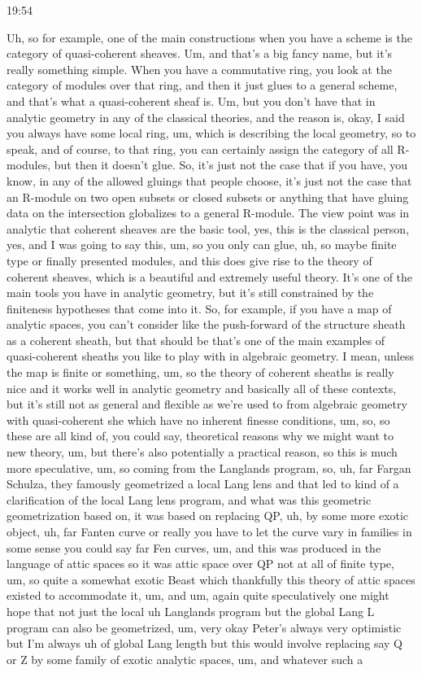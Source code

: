 \begin{unfinished}{19:54}

Uh, so for example, one of the main constructions when you have a scheme is the category of quasi-coherent sheaves. Um, and that's a big fancy name, but it's really something simple. When you have a commutative ring, you look at the category of modules over that ring, and then it just glues to a general scheme, and that's what a quasi-coherent sheaf is. Um, but you don't have that in analytic geometry in any of the classical theories, and the reason is, okay, I said you always have some local ring, um, which is describing the local geometry, so to speak, and of course, to that ring, you can certainly assign the category of all R-modules, but then it doesn't glue. So, it's just not the case that if you have, you know, in any of the allowed gluings that people choose, it's just not the case that an R-module on two open subsets or closed subsets or anything that have gluing data on the intersection globalizes to a general R-module. The view point was in analytic that coherent sheaves are the basic tool, yes, this is the classical person, yes, and I was going to say this, um, so you only can glue, uh, so maybe finite type or finally presented modules, and this does give rise to the theory of coherent sheaves, which is a beautiful and extremely useful theory. It's one of the main tools you have in analytic geometry, but it's still constrained by the finiteness hypotheses that come into it. So, for example, if you have a map of analytic spaces, you can't consider like the push-forward of the structure sheath as a coherent sheath, but that should be that's one of the main examples of quasi-coherent sheaths you like to play with in algebraic geometry. I mean, unless the map is finite or something, um, so the theory of coherent sheaths is really nice and it works well in analytic geometry and basically all of these contexts, but it's still not as general and flexible as we're used to from algebraic geometry with quasi-coherent she which have no inherent finesse conditions, um, so, so these are all kind of, you could say, theoretical reasons why we might want to new theory, um, but there's also potentially a practical reason, so this is much more speculative, um, so coming from the Langlands program, so, uh, far Fargan Schulza, they famously geometrized a local Lang lens and that led to kind of a clarification of the local Lang lens program, and what was this geometric geometrization based on, it was based on replacing QP, uh, by some more exotic object, uh, far Fanten curve or really you have to let the curve vary in families in some sense you could say far Fen curves, um, and this was produced in the language of attic spaces so it was attic space over QP not at all of finite type, um, so quite a somewhat exotic Beast which thankfully this theory of attic spaces existed to accommodate it, um, and um, again quite speculatively one might hope that not just the local uh Langlands program but the global Lang L program can also be geometrized, um, very okay Peter's always very optimistic but I'm always uh of global Lang length but this would involve replacing say Q or Z by some family of exotic analytic spaces, um, and whatever such a 
\end{unfinished}
